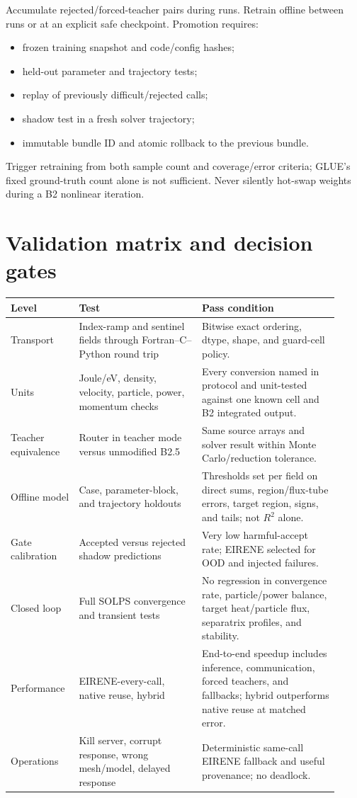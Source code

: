 \documentclass[11pt]{article}
\begin{document}
Accumulate rejected/forced-teacher pairs during runs. Retrain offline between runs or at an explicit safe checkpoint. Promotion requires:

\begin{itemize}
\item frozen training snapshot and code/config hashes;
\item held-out parameter and trajectory tests;
\item replay of previously difficult/rejected calls;
\item shadow test in a fresh solver trajectory;
\item immutable bundle ID and atomic rollback to the previous bundle.
\end{itemize}

Trigger retraining from both sample count and coverage/error criteria; GLUE's fixed ground-truth count alone is not sufficient. Never silently hot-swap weights during a B2 nonlinear iteration.

\section{Validation matrix and decision gates}

\begin{longtable}{@{}p{0.18\linewidth}p{0.35\linewidth}p{0.39\linewidth}@{}}
\toprule
Level & Test & Pass condition \\
\midrule
\endhead
Transport & Index-ramp and sentinel fields through Fortran--C--Python round trip & Bitwise exact ordering, dtype, shape, and guard-cell policy. \\
Units & Joule/eV, density, velocity, particle, power, momentum checks & Every conversion named in protocol and unit-tested against one known cell and B2 integrated output. \\
Teacher equivalence & Router in teacher mode versus unmodified B2.5 & Same source arrays and solver result within Monte Carlo/reduction tolerance. \\
Offline model & Case, parameter-block, and trajectory holdouts & Thresholds set per field on direct sums, region/flux-tube errors, target region, signs, and tails; not $R^2$ alone. \\
Gate calibration & Accepted versus rejected shadow predictions & Very low harmful-accept rate; EIRENE selected for OOD and injected failures. \\
Closed loop & Full SOLPS convergence and transient tests & No regression in convergence rate, particle/power balance, target heat/particle flux, separatrix profiles, and stability. \\
Performance & EIRENE-every-call, native reuse, hybrid & End-to-end speedup includes inference, communication, forced teachers, and fallbacks; hybrid outperforms native reuse at matched error. \\
Operations & Kill server, corrupt response, wrong mesh/model, delayed response & Deterministic same-call EIRENE fallback and useful provenance; no deadlock. \\
\bottomrule
\end{longtable}
\end{document}

